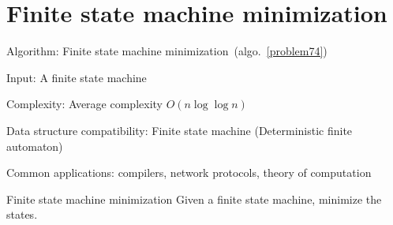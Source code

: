 \documentclass{article}
\begin{document}
\fi

%
%

\def\pbname{Finite state machine minimization} %

\section{\pbname} 

\begin{overview}
\item [Algorithm:] Finite state machine minimization~(algo.~\ref{problem74}) 
\item [Input:] A finite state machine
\item [Complexity:] Average complexity $O(n \log \log n)$
\item [Data structure compatibility:] Finite state machine (Deterministic finite automaton)
\item [Common applications:] compilers, network protocols, theory of computation
\end{overview}



\begin{problem}{\pbname}
	Given a finite state machine, minimize the states.
\end{problem}
\end{document}
